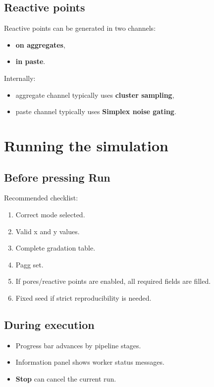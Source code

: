 \documentclass[11pt,a4paper]{article}
\begin{document}
\subsection{Reactive points}
Reactive points can be generated in two channels:
\begin{itemize}[leftmargin=1.5em]
  \item \textbf{on aggregates},
  \item \textbf{in paste}.
\end{itemize}

Internally:
\begin{itemize}[leftmargin=1.5em]
  \item aggregate channel typically uses \textbf{cluster sampling},
  \item paste channel typically uses \textbf{Simplex noise gating}.
\end{itemize}

\section{Running the simulation}
\subsection{Before pressing Run}
Recommended checklist:
\begin{enumerate}[leftmargin=1.7em]
  \item Correct mode selected.
  \item Valid x and y values.
  \item Complete gradation table.
  \item Pagg set.
  \item If pores/reactive points are enabled, all required fields are filled.
  \item Fixed seed if strict reproducibility is needed.
\end{enumerate}

\subsection{During execution}
\begin{itemize}[leftmargin=1.5em]
  \item Progress bar advances by pipeline stages.
  \item Information panel shows worker status messages.
  \item \textbf{Stop} can cancel the current run.
\end{itemize}
\end{document}
